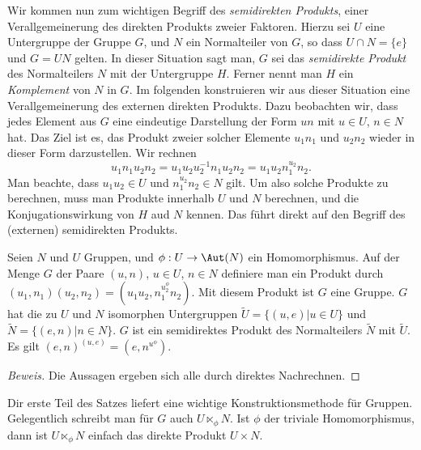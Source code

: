 \documentclass[12pt,a4paper,twoside]{article}
\newcommand{\ei}[1]{\emph{#1}\index{#1}}
\begin{document}
Wir kommen nun zum wichtigen Begriff des \emph{semidirekten
  Produkts}, einer Verallgemeinerung des direkten
Produkts zweier Faktoren. Hierzu sei $U$ eine Untergruppe der Gruppe $G$, und
$N$ ein Normalteiler von $G$, so dass $U\cap N=\{e\}$ und $G=UN$ gelten. In
dieser Situation sagt man, $G$ sei das \emph{semidirekte Produkt} des
Normalteilers $N$ mit der Untergruppe $H$. Ferner nennt man $H$ ein
\ei{Komplement} von $N$ in $G$. Im folgenden konstruieren wir aus dieser
Situation eine Verallgemeinerung des externen direkten Produkts. Dazu
beobachten wir, dass jedes Element aus $G$ eine eindeutige Darstellung der
Form $un$ mit $u\in U$, $n\in N$ hat. Das Ziel ist es, das Produkt zweier
solcher Elemente $u_1n_1$ und $u_2n_2$ wieder in dieser Form darzustellen. Wir
rechnen
\[
u_1n_1u_2n_2=u_1u_2u_2^{-1}n_1u_2n_2=u_1u_2n_1^{u_2}n_2.
\]
Man beachte, dass $u_1u_2\in U$ und $n_1^{u_2}n_2\in N$ gilt. Um also solche
Produkte zu berechnen, muss man Produkte innerhalb $U$ und $N$ berechnen, und
die Konjugationswirkung von $H$ aud $N$ kennen. Das f\"uhrt direkt auf den
Begriff des (externen) semidirekten Produkts.
\begin{Satz}
  Seien $N$ und $U$ Gruppen, und $\phi:U\to\Aut(N)$ ein Homomorphismus. Auf
  der Menge $G$ der Paare $(u,n)$, $u\in U$, $n\in N$ definiere man ein
  Produkt durch $(u_1,n_1)(u_2,n_2)=(u_1u_2,n_1^{u_2^\phi}n_2)$. Mit
  diesem Produkt ist $G$ eine Gruppe. $G$ hat die zu $U$ und $N$ isomorphen
  Untergruppen $\tilde U=\{(u,e)|u\in U\}$ und $\tilde N=\{(e,n)|n\in
  N\}$. $G$ ist ein semidirektes Produkt des Normalteilers $\tilde N$ mit
  $\tilde U$. Es gilt $(e,n)^{(u,e)}=(e,n^{u^\phi})$.
\end{Satz}
\begin{proof}[Beweis]
  Die Aussagen ergeben sich alle durch direktes Nachrechnen.
\end{proof}
\begin{Bemerkung*}
  Dir erste Teil des Satzes liefert eine wichtige Konstruktionsmethode f\"ur
  Gruppen. Gelegentlich schreibt man f\"ur $G$ auch $U\ltimes_\phi N$. Ist
  $\phi$ der triviale Homomorphismus, dann ist $U\ltimes_\phi N$ einfach das
  direkte Produkt $U\times N$.
\end{Bemerkung*}
\end{document}
